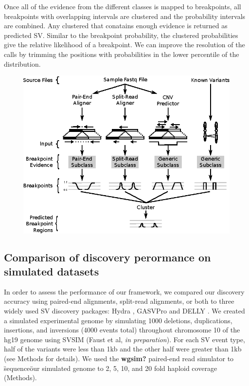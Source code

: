 \documentclass[11pt]{article}
\begin{document}
Once all of the evidence from the different classes is mapped to breakpoints,
all breakpoints with overlapping intervals are clustered and the probability
intervals are combined.  Any clustered that conatains enough evidence is
returned as predicted SV.  Similar to the breakpoint probability, the clustered
probabilities give the relative likelihood of a breakpoint.  We can improve the
resolution of the calls by trimming the positions with probabilities in the
lower percentile of the distribution.


\begin{figure}
\includegraphics{Workflow.eps}
\end{figure}

\subsection{Comparison of discovery perormance on simulated datasets}
In order to assess the performance of our framework, we compared our discovery
accuracy using paired-end alignments, split-read alignments, or both to 
three widely used SV discovery packages: Hydra \cite{Quinlan2010},
GASVPro \cite{Sindi2012} and DELLY \cite{Rausch2012b}. We created a simulated 
experimental genome by simulating 1000 deletions, duplications, insertions, 
and inversions (4000 events total) throughout chromosome 10 of the hg19 genome 
using SVSIM (Faust et al, \emph{in preparation}).  For each SV event type, half
of the variants were less than 1kb and the other half were greater than 1kb (see
Methods for details).  We used the \textbf{wgsim?} paired-end read simulator to
\"sequence\" our simulated genome to 2, 5, 10, and 20 fold haploid coverage
(Methods).
\end{document}
